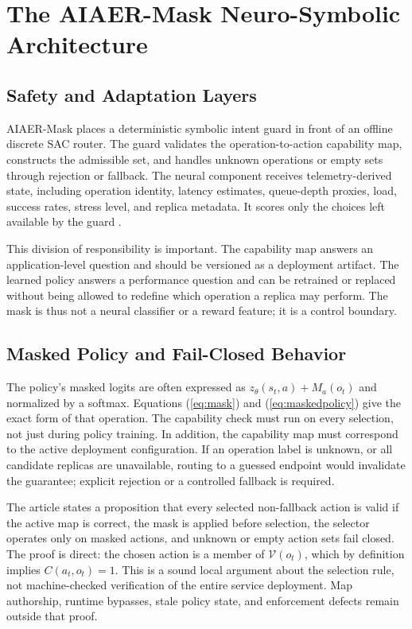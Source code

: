 \documentclass[conference]{IEEEtran}
\begin{document}
\section{The AIAER-Mask Neuro-Symbolic Architecture}
\subsection{Safety and Adaptation Layers}
AIAER-Mask places a deterministic symbolic intent guard in front of an offline discrete SAC router. The guard validates the operation-to-action capability map, constructs the admissible set, and handles unknown operations or empty sets through rejection or fallback. The neural component receives telemetry-derived state, including operation identity, latency estimates, queue-depth proxies, load, success rates, stress level, and replica metadata. It scores only the choices left available by the guard \cite{hassan2026}.

This division of responsibility is important. The capability map answers an application-level question and should be versioned as a deployment artifact. The learned policy answers a performance question and can be retrained or replaced without being allowed to redefine which operation a replica may perform. The mask is thus not a neural classifier or a reward feature; it is a control boundary.

\subsection{Masked Policy and Fail-Closed Behavior}
The policy's masked logits are often expressed as $z_{\theta}(s_t,a)+M_a(o_t)$ and normalized by a softmax. Equations (\ref{eq:mask}) and (\ref{eq:maskedpolicy}) give the exact form of that operation. The capability check must run on every selection, not just during policy training. In addition, the capability map must correspond to the active deployment configuration. If an operation label is unknown, or all candidate replicas are unavailable, routing to a guessed endpoint would invalidate the guarantee; explicit rejection or a controlled fallback is required.

The article states a proposition that every selected non-fallback action is valid if the active map is correct, the mask is applied before selection, the selector operates only on masked actions, and unknown or empty action sets fail closed. The proof is direct: the chosen action is a member of $\mathcal{V}(o_t)$, which by definition implies $C(a_t,o_t)=1$. This is a sound local argument about the selection rule, not machine-checked verification of the entire service deployment. Map authorship, runtime bypasses, stale policy state, and enforcement defects remain outside that proof.
\end{document}
